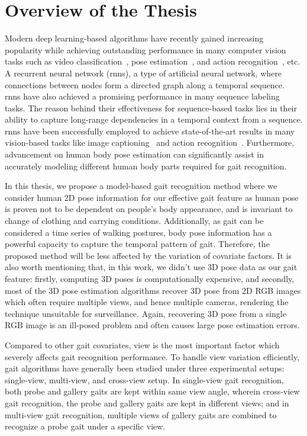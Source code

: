 \section{Overview of the Thesis}
Modern deep learning-based algorithms have recently gained increasing popularity while achieving outstanding performance in many computer vision tasks such as video classification~\cite{karpathy_14}, pose estimation~\cite{Cao_19}, and action recognition~\cite{Song_17, Du_15}, etc. A recurrent neural network (\gls{rnn}s), a type of artificial neural network, where connections between nodes form a directed graph along a temporal sequence. \gls{rnn}s have also achieved a promising performance in many sequence labeling tasks. The reason behind their effectiveness for sequence-based tasks lies in their ability to capture long-range dependencies in a temporal context from a sequence. \gls{rnn}s have been successfully employed to achieve state-of-the-art results in many vision-based tasks like image captioning~\cite{Mao_15} and action recognition~\cite{Song_17, Du_15}. Furthermore, advancement on human body pose estimation can significantly assist in accurately modeling different human body parts required for gait recognition. 

In this thesis, we propose a model-based gait recognition method where we consider human 2D pose information for our effective gait feature as human pose is proven not to be dependent on people's body appearance, and is invariant to change of clothing and carrying conditions. Additionally, as gait can be considered a time series of walking postures, body pose information has a powerful capacity to capture the temporal pattern of gait. Therefore, the proposed method will be less affected by the variation of covariate factors. It is also worth mentioning that, in this work, we didn't use 3D pose data as our gait feature: firstly, computing 3D poses is computationally expensive, and secondly, most of the 3D pose estimation algorithms recover 3D pose from 2D RGB images which often require multiple views, and hence multiple cameras, rendering the technique unsuitable for surveillance. Again, recovering 3D pose from a single RGB image is an ill-posed problem and often causes large pose estimation errors. 

Compared to other gait covariates, view is the most important factor which severely affects gait recognition performance. To handle view variation efficiently, gait algorithms have generally been studied under three experimental setups: single-view, multi-view, and cross-view setup. In single-view gait recognition, both probe and gallery gaits are kept within same view angle, wherein cross-view gait recognition, the probe and gallery gaits are kept in different views; and in multi-view gait recognition, multiple views of gallery gaits are combined to recognize a probe gait under a specific view.


